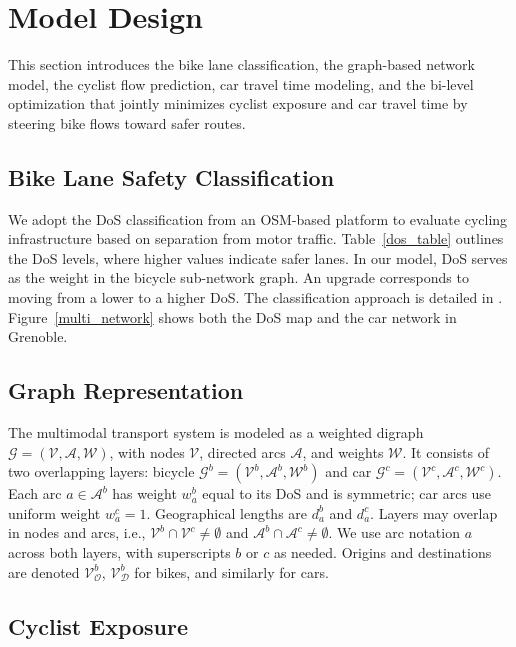 \documentclass[letterpaper, 10 pt, conference]{ieeeconf}  %
\begin{document}
\section{Model Design}
\label{model_design}

This section introduces the bike lane classification, the graph-based network model, the cyclist flow prediction, car travel time modeling, and the bi-level optimization that jointly minimizes cyclist exposure and car travel time by steering bike flows toward safer routes.

\subsection{Bike Lane Safety Classification}

We adopt the DoS classification from an OSM-based platform to evaluate cycling infrastructure based on separation from motor traffic. Table~\ref{dos_table} outlines the DoS levels, where higher values indicate safer lanes. In our model, DoS serves as the weight in the bicycle sub-network graph. An upgrade corresponds to moving from a lower to a higher DoS. The classification approach is detailed in \cite{2024graphbased, jurado2025graph}. Figure~\ref{multi_network} shows both the DoS map and the car network in Grenoble.

\subsection{Graph Representation}

The multimodal transport system is modeled as a weighted digraph $\mathcal{G} = (\mathcal{V}, \mathcal{A}, \mathcal{W})$, with nodes $\mathcal{V}$, directed arcs $\mathcal{A}$, and weights $\mathcal{W}$. It consists of two overlapping layers: bicycle $\mathcal{G}^b = (\mathcal{V}^b, \mathcal{A}^b, \mathcal{W}^b)$ and car $\mathcal{G}^c = (\mathcal{V}^c, \mathcal{A}^c, \mathcal{W}^c)$. Each arc $a \in \mathcal{A}^b$ has weight $w_a^b$ equal to its DoS and is symmetric; car arcs use uniform weight $w_a^c = 1$. Geographical lengths are $d_a^b$ and $d_a^c$. Layers may overlap in nodes and arcs, i.e., $\mathcal{V}^b \cap \mathcal{V}^c \neq \emptyset$ and $\mathcal{A}^b \cap \mathcal{A}^c \neq \emptyset$. We use arc notation $a$ across both layers, with superscripts $b$ or $c$ as needed. Origins and destinations are denoted $\mathcal{V}_{\mathcal{O}}^b$, $\mathcal{V}_{\mathcal{D}}^b$ for bikes, and similarly for cars.

\subsection{Cyclist Exposure}
\label{cyclist_exposure}
\end{document}
